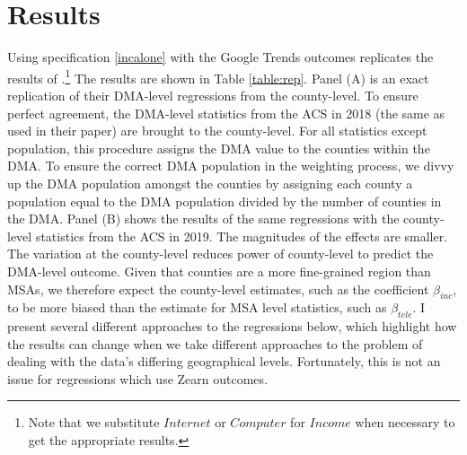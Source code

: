 \section{Results} \label{sec:result}

Using specification \ref{incalone} with the Google Trends outcomes replicates the results of \cite{bh1}.\footnote{Note that we substitute $Internet$ or $Computer$ for $Income$ when necessary to get the appropriate results.} The results are shown in Table \ref{table:rep}. Panel (A) is an exact replication of their DMA-level regressions from the county-level. To ensure perfect agreement, the DMA-level statistics from the ACS in 2018 (the same as used in their paper) are brought to the county-level. For all statistics except population, this procedure assigns the DMA value to the counties within the DMA. To ensure the correct DMA population in the weighting process, we divvy up the DMA population amongst the counties by assigning each county a population equal to the DMA population divided by the number of counties in the DMA.
Panel (B) shows the results of the same regressions with the county-level statistics from the ACS in 2019. The magnitudes of the effects are smaller. The variation at the county-level reduces power of county-level to predict the DMA-level outcome. Given that counties are a more fine-grained region than MSAs, we therefore expect the county-level estimates, such as the coefficient $\beta_{inc}$, to be more biased than the estimate for MSA level statistics, such as $\beta_{tele}$. I present several different approaches to the regressions below, which highlight how the results can change when we take different approaches to the problem of dealing with the data’s differing geographical levels. Fortunately, this is not an issue for regressions which use Zearn outcomes. \par
